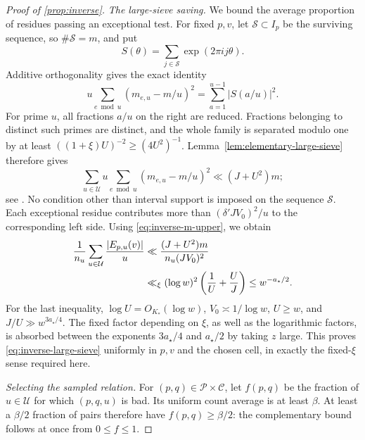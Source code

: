 \begin{proof}[Proof of \cref{prop:inverse}]
\medskip
\emph{The large-sieve saving.}
We bound the average proportion of residues passing an exceptional test.
For fixed \(p,v\), let \(\mathcal S\subset I_p\) be the surviving
sequence, so \(\#\mathcal S=m\), and put
\[
 S(\theta)=\sum_{j\in\mathcal S}\exp(2\pi i j\theta).
 \]
Additive orthogonality gives the exact identity
\begin{equation}
 u\sum_{e\bmod u}(m_{e,u}-m/u)^2
   =\sum_{a=1}^{u-1}|S(a/u)|^2.
 \label{eq:inverse-orthogonality}
\end{equation}
For prime \(u\), all fractions \(a/u\) on the right are reduced.
Fractions belonging to distinct such primes are distinct, and the
whole family is separated modulo one by at least
\(((1+\xi)U)^{-2}\ge(4U^2)^{-1}\).
Lemma~\ref{lem:elementary-large-sieve} therefore gives
\[
 \sum_{u\in\mathcal U}
 u\sum_{e\bmod u}(m_{e,u}-m/u)^2
 \ll (J+U^2)m;
\]
see \cite{MontgomeryVaughan1973,VaughanLargeSieve}.
No condition other than interval support is imposed on the sequence
\(\mathcal S\).
Each exceptional residue contributes more than
\((\delta'JV_0)^2/u\) to the corresponding left side.
Using \eqref{eq:inverse-m-upper}, we obtain
\begin{align}
 \frac1{n_u}\sum_{u\in\mathcal U}\frac{|E_{p,u}(v)|}{u}
 &\ll
 \frac{(J+U^2)m}{n_u(JV_0)^2} \notag\\
 &\ll_\xi(\log w)^2\left(\frac1U+\frac UJ\right)
 \le w^{-a_\star/2}.
 \label{eq:inverse-large-sieve}
\end{align}
For the last inequality, \(\log U=O_{K_*}(\log w)\),
\(V_0\asymp1/\log w\), \(U\ge w\), and
\(J/U\gg w^{3a_\star/4}\).
The fixed factor depending on \(\xi\), as well as the logarithmic
factors, is absorbed between the exponents \(3a_\star/4\) and
\(a_\star/2\) by taking \(z\) large.
This proves \eqref{eq:inverse-large-sieve} uniformly in \(p,v\) and
the chosen cell, in exactly the fixed-\(\xi\) sense required here.

\medskip
\emph{Selecting the sampled relation.}
For \((p,q)\in\mathcal P\times\mathcal C\), let \(f(p,q)\) be the
fraction of \(u\in\mathcal U\) for which \((p,q,u)\) is bad.
Its uniform count average is at least \(\beta\).
At least a \(\beta/2\) fraction of pairs therefore have
\(f(p,q)\ge\beta/2\): the complementary bound follows at once from
\(0\le f\le1\).


\end{proof}

